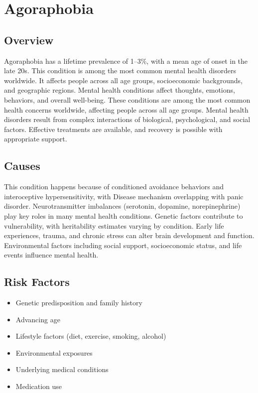 \chapter{Agoraphobia}
\label{sec:Agoraphobia}

\section{Overview}
Agoraphobia has a lifetime prevalence of 1--3\%, with a mean age of onset in the late 20s. This condition is among the most common mental health disorders worldwide. It affects people across all age groups, socioeconomic backgrounds, and geographic regions. Mental health conditions affect thoughts, emotions, behaviors, and overall well-being. These conditions are among the most common health concerns worldwide, affecting people across all age groups. Mental health disorders result from complex interactions of biological, psychological, and social factors. Effective treatments are available, and recovery is possible with appropriate support.
\section{Causes}
This condition happens because of conditioned avoidance behaviors and interoceptive hypersensitivity, with Disease mechanism overlapping with panic disorder.  Neurotransmitter imbalances (serotonin, dopamine, norepinephrine) play key roles in many mental health conditions. Genetic factors contribute to vulnerability, with heritability estimates varying by condition. Early life experiences, trauma, and chronic stress can alter brain development and function. Environmental factors including social support, socioeconomic status, and life events influence mental health.   
\section{Risk Factors}
\begin{itemize}[noitemsep]
  \item Genetic predisposition and family history
  \item Advancing age
  \item Lifestyle factors (diet, exercise, smoking, alcohol)
  \item Environmental exposures
  \item Underlying medical conditions
  \item Medication use
\end{itemize}
